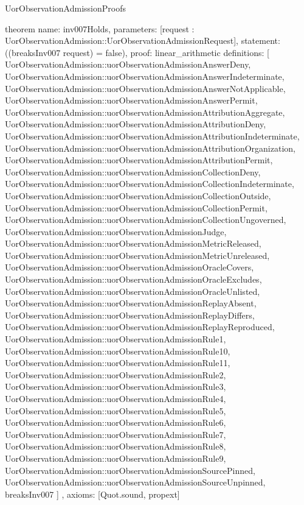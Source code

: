 \begin{lexlean}{UorObservationAdmissionProofs}
\begin{semanticmodule}
theorem{
  name: inv007Holds,
  parameters: [request : UorObservationAdmission::UorObservationAdmissionRequest],
  statement: ((breaksInv007 request) = false),
  proof: linear_arithmetic{
    definitions: [
      UorObservationAdmission::uorObservationAdmissionAnswerDeny,
      UorObservationAdmission::uorObservationAdmissionAnswerIndeterminate,
      UorObservationAdmission::uorObservationAdmissionAnswerNotApplicable,
      UorObservationAdmission::uorObservationAdmissionAnswerPermit,
      UorObservationAdmission::uorObservationAdmissionAttributionAggregate,
      UorObservationAdmission::uorObservationAdmissionAttributionDeny,
      UorObservationAdmission::uorObservationAdmissionAttributionIndeterminate,
      UorObservationAdmission::uorObservationAdmissionAttributionOrganization,
      UorObservationAdmission::uorObservationAdmissionAttributionPermit,
      UorObservationAdmission::uorObservationAdmissionCollectionDeny,
      UorObservationAdmission::uorObservationAdmissionCollectionIndeterminate,
      UorObservationAdmission::uorObservationAdmissionCollectionOutside,
      UorObservationAdmission::uorObservationAdmissionCollectionPermit,
      UorObservationAdmission::uorObservationAdmissionCollectionUngoverned,
      UorObservationAdmission::uorObservationAdmissionJudge,
      UorObservationAdmission::uorObservationAdmissionMetricReleased,
      UorObservationAdmission::uorObservationAdmissionMetricUnreleased,
      UorObservationAdmission::uorObservationAdmissionOracleCovers,
      UorObservationAdmission::uorObservationAdmissionOracleExcludes,
      UorObservationAdmission::uorObservationAdmissionOracleUnlisted,
      UorObservationAdmission::uorObservationAdmissionReplayAbsent,
      UorObservationAdmission::uorObservationAdmissionReplayDiffers,
      UorObservationAdmission::uorObservationAdmissionReplayReproduced,
      UorObservationAdmission::uorObservationAdmissionRule1,
      UorObservationAdmission::uorObservationAdmissionRule10,
      UorObservationAdmission::uorObservationAdmissionRule11,
      UorObservationAdmission::uorObservationAdmissionRule2,
      UorObservationAdmission::uorObservationAdmissionRule3,
      UorObservationAdmission::uorObservationAdmissionRule4,
      UorObservationAdmission::uorObservationAdmissionRule5,
      UorObservationAdmission::uorObservationAdmissionRule6,
      UorObservationAdmission::uorObservationAdmissionRule7,
      UorObservationAdmission::uorObservationAdmissionRule8,
      UorObservationAdmission::uorObservationAdmissionRule9,
      UorObservationAdmission::uorObservationAdmissionSourcePinned,
      UorObservationAdmission::uorObservationAdmissionSourceUnpinned,
      breaksInv007
    ]
  },
  axioms: [Quot.sound, propext]
}


\end{semanticmodule}
\end{lexlean}
